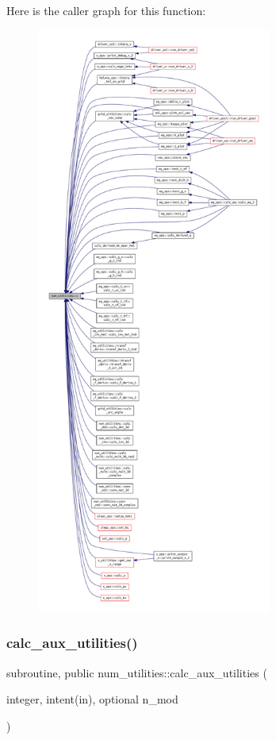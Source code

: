 Here is the caller graph for this function\+:
\nopagebreak
\begin{figure}[H]
\begin{center}
\leavevmode
\includegraphics[height=550pt]{namespacenum__utilities_a5ee3fbd1fe67d0deefc7194631389f2a_icgraph}
\end{center}
\end{figure}
\mbox{\label{namespacenum__utilities_af461ae4c95a7a45da875dcf311e323f5}} 
\subsubsection{\texorpdfstring{calc\+\_\+aux\+\_\+utilities()}{calc\_aux\_utilities()}}
{\footnotesize\ttfamily subroutine, public num\+\_\+utilities\+::calc\+\_\+aux\+\_\+utilities (\begin{DoxyParamCaption}\item[{integer, intent(in), optional}]{n\+\_\+mod }\end{DoxyParamCaption})}



